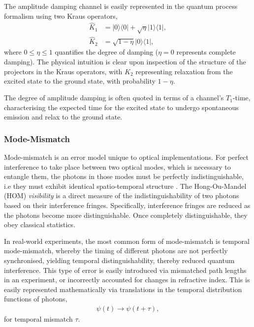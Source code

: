 \documentclass[aps,rmp,twocolumn,amsmath,amssymb,nofootinbib,superscriptaddress]{revtex4}
\newcommand{\bra}[1]{\langle#1|}
\newcommand{\ket}[1]{|#1\rangle}
\begin{document}
The amplitude damping channel is easily represented in the quantum process formalism using two Kraus operators,
\begin{align}
\hat{K}_1 &= \ket{0}\bra{0} + \sqrt\eta\ket{1}\bra{1}, \nonumber \\
\hat{K}_2 &= \sqrt{1-\eta}\ket{0}\bra{1}, 
\end{align}
where \mbox{$0\leq\eta\leq 1$} quantifies the degree of damping (\mbox{$\eta=0$} represents complete damping). The physical intuition is clear upon inspection of the structure of the projectors in the Kraus operators, with $\hat{K}_2$ representing relaxation from the excited state to the ground state, with probability \mbox{$1-\eta$}.

The degree of amplitude damping is often quoted in terms of a channel's $T_1$-time, characterising the expected time for the excited state to undergo spontaneous emission and relax to the ground state.

%
%

\subsubsection{Mode-Mismatch} \label{sec:MM_error}

Mode-mismatch is an error model unique to optical implementations. For perfect interference to take place between two optical modes, which is necessary to entangle them, the photons in those modes must be perfectly indistinguishable, i.e they must exhibit identical spatio-temporal structure \cite{bib:RohdeMauererSilberhorn07}. The Hong-Ou-Mandel (HOM) \cite{bib:HOM87} \emph{visibility} is a direct measure of the indistinguishability of two photons based on their interference fringes. Specifically, interference fringes are reduced as the photons become more distinguishable. Once completely distinguishable, they obey classical statistics.

In real-world experiments, the most common form of mode-mismatch is temporal mode-mismatch, whereby the timing of different photons are not perfectly synchronised, yielding temporal distinguishability, thereby reduced quantum interference. This type of error is easily introduced via mismatched path lengths in an experiment, or incorrectly accounted for changes in refractive index. This is easily represented mathematically via translations in the temporal distribution functions of photons,
\begin{align}
\psi(t) \to \psi(t+\tau),
\end{align}
for temporal mismatch $\tau$.
\end{document}

